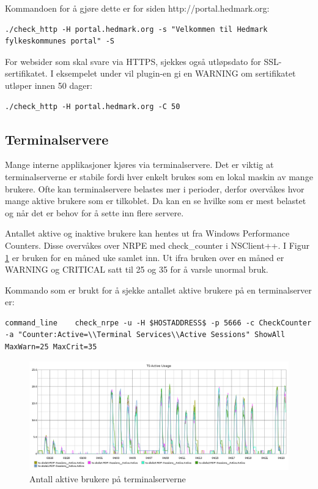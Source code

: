 Kommandoen for å gjøre dette er for siden http://portal.hedmark.org:
\begin{lstlisting}[style=example]
./check_http -H portal.hedmark.org -s "Velkommen til Hedmark fylkeskommunes portal" -S 
\end{lstlisting}

For websider som skal svare via HTTPS, sjekkes også utløpsdato for SSL-sertifikatet. I eksempelet under vil plugin-en gi en WARNING om sertifikatet utløper innen 50 dager:
\begin{lstlisting}[style=example]
./check_http -H portal.hedmark.org -C 50
\end{lstlisting}

\subsection{Terminalservere}\label{sec:terminalservere}
Mange interne applikasjoner kjøres via terminalservere. Det er viktig at terminalserverne er stabile fordi hver enkelt brukes som en lokal maskin av mange brukere. Ofte kan terminalservere belastes mer i perioder, derfor overvåkes hvor mange aktive brukere som er tilkoblet. Da kan en se hvilke som er mest belastet og når det er behov for å sette inn flere servere.

Antallet aktive og inaktive brukere kan hentes ut fra Windows Performance Counters. Disse overvåkes over NRPE med check\_counter i NSClient++. I Figur \ref{ts-skole-usage} er bruken for en måned uke samlet inn. Ut ifra bruken over en måned er WARNING og CRITICAL satt til 25 og 35 for å varsle unormal bruk.

Kommando som er brukt for å sjekke antallet aktive brukere på en terminalserver er:
 
\begin{lstlisting}[style=example]
	command_line	check_nrpe -u -H $HOSTADDRESS$ -p 5666 -c CheckCounter -a "Counter:Active=\\Terminal Services\\Active Sessions" ShowAll MaxWarn=25 MaxCrit=35
\end{lstlisting}

\begin{figure}[H]
	\centering
	\includegraphics[width=1.0\textwidth]{img/ts-skole-usage-inv}
	\caption{Antall aktive brukere på terminalserverne}
	\label{ts-skole-usage}
\end{figure}

